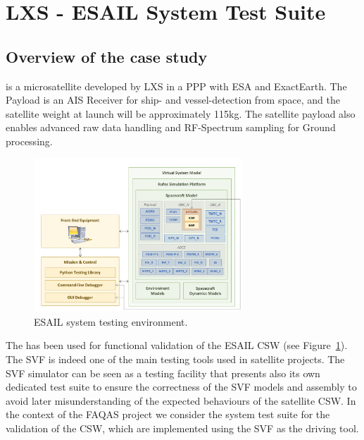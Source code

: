 
\section{LXS - ESAIL System Test Suite}
\label{chapter:caseStudies:LXS}

\subsection{Overview of the case study}

 is a microsatellite developed by LXS in a PPP with ESA and ExactEarth. 
The Payload is an AIS Receiver for ship- and vessel-detection from space, and the satellite weight at launch will be approximately 115kg. The satellite payload also enables advanced raw data handling and RF-Spectrum sampling for Ground processing.

\begin{figure}[h]
	\centering
    \includegraphics[width=0.7\textwidth]{images/esail}
    \caption{ESAIL system testing environment.}
    \label{fig:esail_case_study}
\end{figure}
 
The  has been used for functional validation of the ESAIL CSW (see Figure~\ref{fig:esail_case_study}). The SVF is indeed one of the main testing tools used in satellite projects. The SVF simulator can be seen as a testing facility that presents also its own dedicated test suite to ensure the correctness of the SVF models and assembly to avoid later misunderstanding of the expected behaviours of the satellite CSW. 
In the context of the FAQAS project we consider the system test suite for the validation of the CSW, which are implemented using the SVF as the driving tool.

